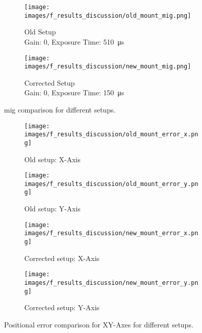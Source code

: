 \begin{figure}[h]
    \centering
    \captionsetup{justification=centering}
    \begin{subfigure}[b]{0.49\textwidth}
        \centering
        \texttt{[image: images/f\_results\_discussion/old\_mount\_mig.png]}
        \caption{Old Setup \\ Gain: 0, Exposure Time: \SI{510}{\micro\second}}
        \label{fig:old_mount_mig.png}
    \end{subfigure}
    \begin{subfigure}[b]{0.46\textwidth}
        \centering
        \texttt{[image: images/f\_results\_discussion/new\_mount\_mig.png]}
        \caption{Corrected Setup \\ Gain: 0, Exposure Time: \SI{150}{\micro\second}}
        \label{fig:new_mount_mig.png}
    \end{subfigure}
    \caption{\gls{mig} comparison for different setups.}
    \label{fig:mig_comparison_setups}
\end{figure}

\begin{figure}[h]
    \centering
    \captionsetup{justification=centering}
    \begin{subfigure}[b]{0.49\textwidth}
        \centering
        \texttt{[image: images/f\_results\_discussion/old\_mount\_error\_x.png]}
        \caption{Old setup: X-Axis}
        \label{fig:old_mount_error_x.png}
    \end{subfigure}
    \hfill
    \begin{subfigure}[b]{0.49\textwidth}
        \centering
        \texttt{[image: images/f\_results\_discussion/old\_mount\_error\_y.png]}
        \caption{Old setup: Y-Axis}
        \label{fig:old_mount_error_y.png}
    \end{subfigure}
    \begin{subfigure}[b]{0.44\textwidth}
        \texttt{[image: images/f\_results\_discussion/new\_mount\_error\_x.png]}
        \caption{Corrected setup: X-Axis}
        \label{fig:new_mount_error_x.png}
    \end{subfigure}
    \hspace{5mm}
    \begin{subfigure}[b]{0.44\textwidth}
        \centering
        \texttt{[image: images/f\_results\_discussion/new\_mount\_error\_y.png]}
        \caption{Corrected setup: Y-Axis}
        \label{fig:new_mount_error_y.png}
    \end{subfigure}
    \caption{Positional error comparison for XY-Axes for different setups.}
    \label{fig:error_comparison_setups}
\end{figure}


